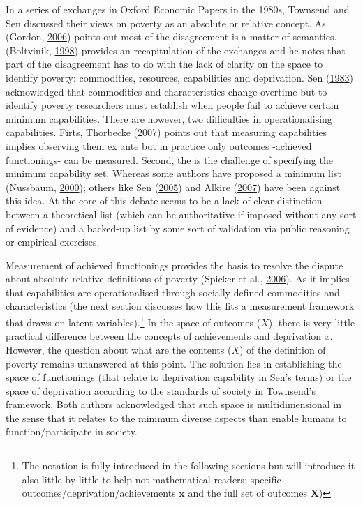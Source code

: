 \documentclass[]{book}
\let\rmarkdownfootnote\footnote%
\def\footnote{\protect\rmarkdownfootnote}
\begin{document}
In a series of exchanges in Oxford Economic Papers in the 1980s, Townsend and Sen discussed their views on poverty as an absolute or relative concept. As (Gordon, \protect\hyperlink{ref-Gordon2006}{2006}) points out most of the disagreement is a matter of semantics. (Boltvinik, \protect\hyperlink{ref-Boltvinik1998}{1998}) provides an recapitulation of the exchanges and he notes that part of the disagreement has to do with the lack of clarity on the space to identify poverty: commodities, resources, capabilities and deprivation. Sen (\protect\hyperlink{ref-Sen1983}{1983}) acknowledged that commodities and characteristics change overtime but to identify poverty researchers must establish when people fail to achieve certain minimum capabilities. There are however, two difficulties in operationalising capabilities. Firts, Thorbecke (\protect\hyperlink{ref-Thorbecke2007}{2007}) points out that measuring capabilities implies observing them ex ante but in practice only outcomes -achieved functionings- can be measured. Second, the is the challenge of specifying the minimum capability set. Whereas some authors have proposed a minimum list (Nussbaum, \protect\hyperlink{ref-Nussbaum2000}{2000}); others like Sen (\protect\hyperlink{ref-Sen2005}{2005}) and Alkire (\protect\hyperlink{ref-Alkire2007}{2007}) have been against this idea. At the core of this debate seems to be a lack of clear distinction between a theoretical list (which can be authoritative if imposed without any sort of evidence) and a backed-up list by some sort of validation via public reasoning or empirical exercises.

Measurement of achieved functionings provides the basis to resolve the dispute about absolute-relative definitions of poverty (Spicker et al., \protect\hyperlink{ref-Spicker2006}{2006}). As it implies that capabilities are operationalised through socially defined commodities and characteristics (the next section discusses how this fits a measurement framework that draws on latent variables).\footnote{The notation is fully introduced in the following sections but will introduce it also little by little to help not mathematical readers: specific outcomes/deprivation/achievements \(\mathbf{x}\) and the full set of outcomes \(\mathbf{X}\))} In the space of outcomes (\(X\)), there is very little practical difference between the concepts of achievements and deprivation \(x\). However, the question about what are the contents (\(X\)) of the definition of poverty remains unanswered at this point. The solution lies in establishing the space of functionings (that relate to deprivation capability in Sen's terms) or the space of deprivation according to the standards of society in Townsend's framework. Both authors acknowledged that such space is multidimensional in the sense that it relates to the minimum diverse aspects than enable humans to function/participate in society.
\end{document}
